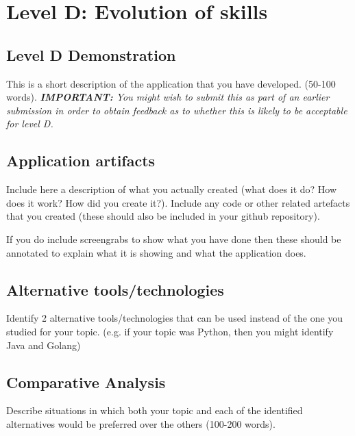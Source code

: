 \documentclass[a4paper, 11pt]{report}
\begin{document}

\newpage
\section{Level D: Evolution of skills}
\vspace{5mm}
\subsection{Level D Demonstration}

This is a short description of the application that you have developed. (50-100 words).
\textit{{\bf IMPORTANT:} You might wish to submit this as part of an earlier submission in order to obtain feedback as to whether this is likely to be acceptable for level D.}

\subsection{Application artifacts}

Include here a description of what you actually created (what does it do? How does it work? How did you create it?). Include any code or other related artefacts that you created (these should also be included in your github repository).

If you do include screengrabs to show what you have done then these should be annotated to explain what it is showing and what the application does.

\subsection{Alternative tools/technologies}
Identify 2 alternative tools/technologies that can be used instead of the one you studied for your topic. (e.g. if your topic was Python, then you might identify Java and Golang)
\subsection{Comparative Analysis}
Describe situations in which both your topic and each of the identified alternatives would be preferred over the others (100-200 words).




\newpage



\end{document}
